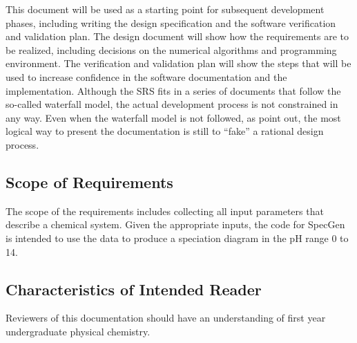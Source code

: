 \documentclass[12pt]{article}
\begin{document}
This document will be used as a starting point for subsequent development
phases, including writing the design specification and the software verification
and validation plan. The design document will show how the requirements are to
be realized, including decisions on the numerical algorithms and programming
environment. The verification and validation plan will show the steps that will
be used to increase confidence in the software documentation and the
implementation. Although the SRS fits in a series of documents that follow the
so-called waterfall model, the actual development process is not constrained in
any way. Even when the waterfall model is not followed, as
\cite{ParnasAndClements1986} point out, the most logical way to present the
documentation is still to ``fake''  a rational design process.


\subsection{Scope of Requirements} 
 
The scope of the requirements includes collecting all input parameters that
describe a chemical system. Given the appropriate inputs, the code for SpecGen
is intended to use the data to produce a speciation diagram in the pH range 0 to
14.  

\subsection{Characteristics of Intended Reader} 
Reviewers of this documentation should have an understanding of first year 
undergraduate physical chemistry.
\end{document}
